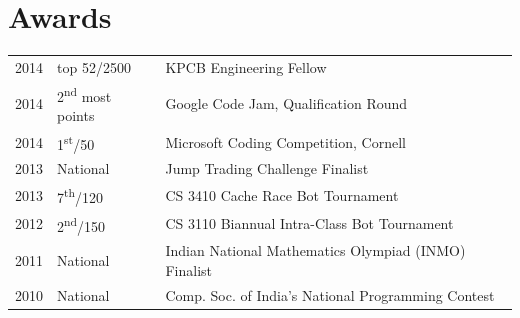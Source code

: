 \documentclass[a4paper]{deedy-resume} %
\begin{document}
\begin{minipage}[t]{0.66\textwidth}
\begin{tightitemize}
\item
\end{tightitemize}

\sectionspace %



\begin{tightitemize}
\item
\end{tightitemize}

\sectionspace %



\begin{tightitemize}
\item
\end{tightitemize}

\sectionspace %


\section{Awards} 

\begin{tabular}{rll}
2014	 & top 52/2500 & KPCB Engineering Fellow\\
2014	 & 2\textsuperscript{nd} most points & Google Code Jam, Qualification Round\\
2014	 & 1\textsuperscript{st}/50 & Microsoft Coding Competition, Cornell\\
2013	 & National & Jump Trading Challenge Finalist\\
2013 & 7\textsuperscript{th}/120 & CS 3410 Cache Race Bot Tournament \\
2012 & 2\textsuperscript{nd}/150 & CS 3110 Biannual Intra-Class Bot Tournament \\
2011 & National & Indian National Mathematics Olympiad (INMO) Finalist \\
2010 & National & Comp. Soc. of India's National Programming Contest\\
\end{tabular}


\end{minipage}
\end{document}
